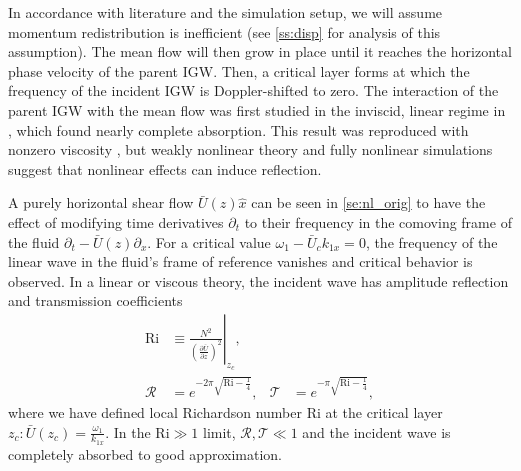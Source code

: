 \documentclass[
        fleqn,
        usenatbib,
    ]{mnras}
\newcommand*{\pd}[2]{\frac{\partial#1}{\partial#2}}
\newcommand*{\at}[1]{\left.#1\right|}
\newcommand*{\p}[1]{\left(#1\right)}
\begin{document}
In accordance with literature and the simulation setup, we will assume momentum
redistribution is inefficient (see \autoref{ss:disp} for analysis of this
assumption). The mean flow will then grow in place until it reaches the
horizontal phase velocity of the parent IGW\@. Then, a critical layer forms at
which the frequency of the incident IGW is Doppler-shifted to zero. The
interaction of the parent IGW with the mean flow was first studied in the
inviscid, linear regime in \citep{booker_bretherton}, which found nearly
complete absorption. This result was reproduced with nonzero viscosity
\citep{hazel}, but weakly nonlinear theory \citep{brown_stewartson} and fully
nonlinear simulations \citep{winters1994} suggest that nonlinear effects can
induce reflection.

A purely horizontal shear flow $\bar{U}(z) \hat{x}$ can be seen in
\autoref{se:nl_orig} to have the effect of modifying time derivatives
$\partial_t$ to their frequency in the comoving frame of the fluid $\partial_t -
\bar{U}(z)\partial_x$. For a critical value $\omega_1 - \bar{U}_c k_{1x} = 0$,
the frequency of the linear wave in the fluid's frame of reference vanishes and
critical behavior is observed. In a linear \citep{booker_bretherton} or viscous
\citep{hazel} theory, the incident wave has amplitude reflection and
transmission coefficients
\begin{align}
    \mathrm{Ri} &\equiv \at{\frac{N^2}{\p{\pd{\bar{U}}{z}}^2}}_{z_c},
        \label{eq:ri_def}\\
    \mathcal{R} &= e^{-2\pi \sqrt{\mathrm{Ri} - \frac{1}{4}}}, &
    \mathcal{T} &= e^{-\pi \sqrt{\mathrm{Ri} - \frac{1}{4}}},
        \label{eq:crit_coeffs}
\end{align}
where we have defined local Richardson number Ri at the critical layer $z_c:
\bar{U}(z_c) = \frac{\omega_1}{k_{1x}}$. In the $\mathrm{Ri} \gg 1$ limit,
$\mathcal{R}, \mathcal{T} \ll 1$ and the incident wave is completely absorbed to
good approximation.
\end{document}

